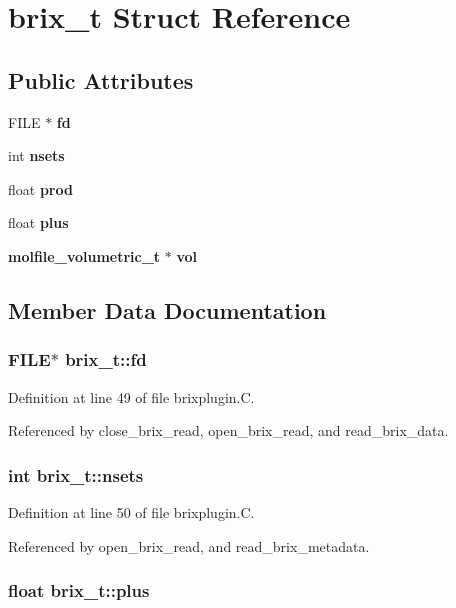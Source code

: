 \section{brix\_\-t  Struct Reference}
\label{structbrix__t}
\subsection*{Public Attributes}
\begin{CompactItemize}
\item 
FILE $\ast$ {\bf fd}
\item 
int {\bf nsets}
\item 
float {\bf prod}
\item 
float {\bf plus}
\item 
{\bf molfile\_\-volumetric\_\-t} $\ast$ {\bf vol}
\end{CompactItemize}


\subsection{Member Data Documentation}
\subsubsection{\setlength{\rightskip}{0pt plus 5cm}FILE$\ast$ brix\_\-t::fd}\label{structbrix__t_m0}




Definition at line 49 of file brixplugin.C.

Referenced by close\_\-brix\_\-read, open\_\-brix\_\-read, and read\_\-brix\_\-data.
\subsubsection{\setlength{\rightskip}{0pt plus 5cm}int brix\_\-t::nsets}\label{structbrix__t_m1}




Definition at line 50 of file brixplugin.C.

Referenced by open\_\-brix\_\-read, and read\_\-brix\_\-metadata.
\subsubsection{\setlength{\rightskip}{0pt plus 5cm}float brix\_\-t::plus}\label{structbrix__t_m3}




